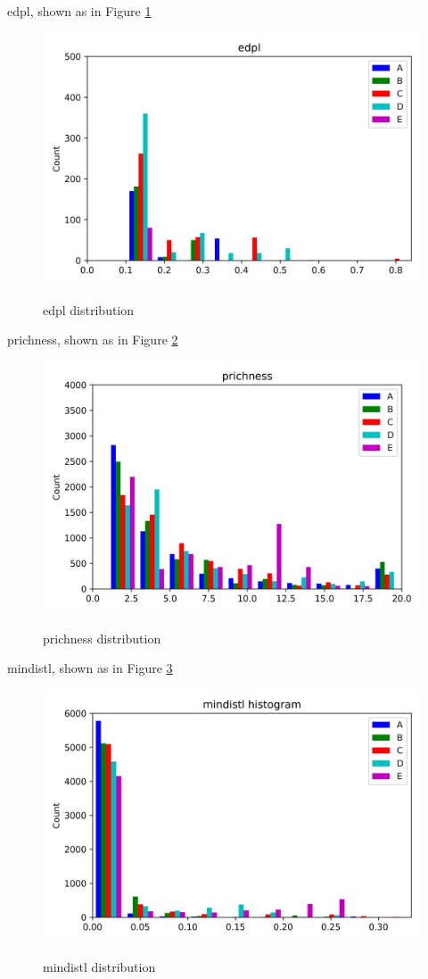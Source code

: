 \documentclass{article}
\begin{document}
edpl, shown as in Figure \ref{edpl}
\begin{figure}[htbp]
	\centering
	\includegraphics[width=\textwidth, keepaspectratio]{edpl.png}\\
	\caption{edpl distribution}
	\label{edpl}
\end{figure}


prichness, shown as in Figure \ref{prichness}
\begin{figure}[htbp]
	\centering
	\includegraphics[width=\textwidth, keepaspectratio]{prichness.png}\\
	\caption{prichness distribution}
	\label{prichness}
\end{figure}


mindistl, shown as in Figure \ref{mindistl}
\begin{figure}[htbp]
	\centering
	\includegraphics[width=\textwidth, keepaspectratio]{mindistl.png}\\
	\caption{mindistl distribution}
	\label{mindistl}
\end{figure}
\end{document}
